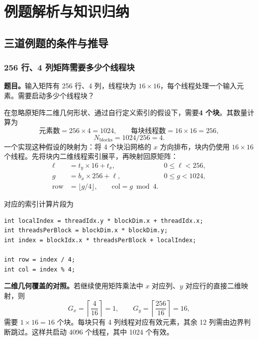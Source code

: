 
\section{例题解析与知识归纳}

\subsection{三道例题的条件与推导}

\subsubsection{256 行、4 列矩阵需要多少个线程块}

\textbf{题目。}输入矩阵有 256 行、4 列，线程块为 $16\times16$，每个线程处理一个输入元素。需要启动多少个线程块？

在忽略原矩阵二维几何形状、通过自行定义索引的假设下，需要\textbf{4 个块}。其数量计算为
\[
\text{元素数}=256\times4=1024,\qquad
\text{每块线程数}=16\times16=256,
\]
\[
N_{\mathrm{blocks}}=1024/256=4.
\]
一个实现这种假设的映射为：将 4 个块沿网格的 $x$ 方向排布，块内仍使用 $16\times16$ 个线程。先将块内二维线程索引展平，再映射回原矩阵：
\begin{align*}
\ell &=t_y\times16+t_x, &0\le\ell<256,\\
g&=b_x\times256+\ell, &0\le g<1024,\\
\mathrm{row}&=\lfloor g/4\rfloor,\qquad
\mathrm{col}=g\bmod4.
\end{align*}
\par\noindent\begin{minipage}{\linewidth}
对应的索引计算片段为

\begin{lstlisting}[caption={由原题的展平假设展开得到的索引片段。}]
int localIndex = threadIdx.y * blockDim.x + threadIdx.x;
int threadsPerBlock = blockDim.x * blockDim.y;
int index = blockIdx.x * threadsPerBlock + localIndex;

int row = index / 4;
int col = index % 4;
\end{lstlisting}
\end{minipage}\par

\textbf{二维几何覆盖的对照。}若继续使用矩阵乘法中 $x$ 对应列、$y$ 对应行的直接二维映射，则 
\[
G_x=\left\lceil\frac4{16}\right\rceil=1,\qquad
G_y=\left\lceil\frac{256}{16}\right\rceil=16,
\]
需要 $1\times16=16$ 个块。每块只有 4 列线程对应有效元素，其余 12 列需由边界判断跳过。这样共启动 4096 个线程，其中 1024 个有效。

